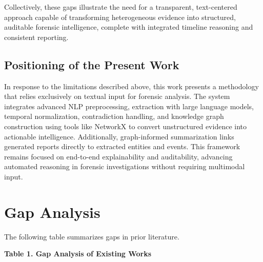 \documentclass{ieeeaccess}
\begin{document}
Collectively, these gaps illustrate the need for a transparent, text-centered approach capable of transforming heterogeneous evidence into structured, auditable forensic intelligence, complete with integrated timeline reasoning and consistent reporting.

\subsection{Positioning of the Present Work}

In response to the limitations described above, this work presents a methodology that relies exclusively on textual input for forensic analysis. The system integrates advanced NLP preprocessing, extraction with large language models, temporal normalization, contradiction handling, and knowledge graph construction using tools like NetworkX to convert unstructured evidence into actionable intelligence. Additionally, graph-informed summarization links generated reports directly to extracted entities and events. This framework remains focused on end-to-end explainability and auditability, advancing automated reasoning in forensic investigations without requiring multimodal input.

\section{Gap Analysis}
The following table summarizes gaps in prior literature.

\begin{center}
\textbf{Table 1. Gap Analysis of Existing Works}\\[4pt]
\renewcommand{\arraystretch}{1.25}
\end{center}
\end{document}
